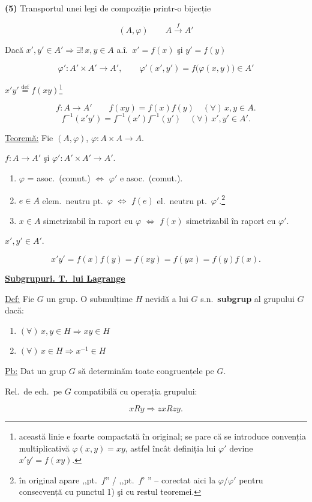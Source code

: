 \documentclass[12pt]{article}
\begin{document}
\noindent\textbf{(5)} Transportul unei legi de compoziție printr-o bijecție

\[
(A,\varphi) \qquad A \xrightarrow{f} A'
\]

\noindent Dacă $x',y'\in A' \Rightarrow \exists!\, x,y\in A$ a.î.\ $x'=f(x)$ şi $y'=f(y)$

\[
\varphi' : A'\times A' \to A', \qquad \varphi'(x',y') = f\big(\varphi(x,y)\big) \in A'
\]

\noindent [notație: $\varphi(x,y)=xy$] \quad $x'y' \overset{\text{def}}{=} f(xy)$\footnote{această linie e foarte compactată în original; se pare că se introduce convenția multiplicativă $\varphi(x,y)=xy$, astfel încât definiția lui $\varphi'$ devine $x'y'=f(xy)$.}

\[
f : A\to A' \qquad f(xy) = f(x)f(y) \quad (\forall)\,x,y\in A.
\]
\[
f^{-1}(x'y') = f^{-1}(x')f^{-1}(y') \quad (\forall)\,x',y'\in A'.
\]

\bigskip
\noindent\underline{Teoremă:} Fie $(A,\varphi)$, $\varphi:A\times A\to A$.

\noindent $f:A\to A'$ şi $\varphi':A'\times A'\to A'$.

\begin{enumerate}
\item[1)] $\varphi$ = asoc.\ (comut.) $\Leftrightarrow$ $\varphi'$ e asoc.\ (comut.).
\item[2)] $e\in A$ elem.\ neutru pt.\ $\varphi$ $\Leftrightarrow$ $f(e)$ el.\ neutru pt.\ $\varphi'$.\footnote{în original apare ,,pt.\ $f$'' / ,,pt.\ $f$' '' -- corectat aici la $\varphi$/$\varphi'$ pentru consecvență cu punctul 1) şi cu restul teoremei.}
\item[3)] $x\in A$ simetrizabil în raport cu $\varphi$ $\Leftrightarrow$ $f(x)$ simetrizabil în raport cu $\varphi'$.
\end{enumerate}

\noindent $x',y'\in A'$.

\[
x'y' = f(x)f(y) = f(xy) = f(yx) = f(y)f(x).
\]

\bigskip
\begin{center}
\end{center}

\noindent\underline{\textbf{Subgrupuri. T.\ lui Lagrange}}

\bigskip
\noindent\underline{Def:} Fie $G$ un grup. O submulțime $H$ nevidă a lui $G$ s.n.\ \textbf{subgrup} al grupului $G$ dacă:

\begin{enumerate}
\item[(1)] $(\forall)\,x,y\in H \Rightarrow xy\in H$
\item[(2)] $(\forall)\,x\in H \Rightarrow x^{-1}\in H$
\end{enumerate}

\bigskip
\noindent\underline{Pb:} Dat un grup $G$ să determinăm toate congruențele pe $G$.

\noindent Rel.\ de ech.\ pe $G$ compatibilă cu operația grupului:

\[
xRy \Rightarrow zxRzy.
\]
\end{document}
